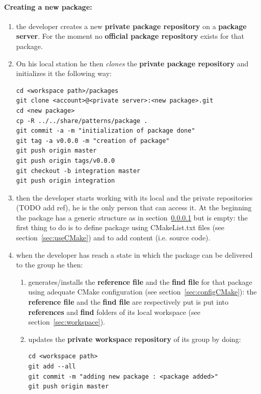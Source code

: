 \documentclass[12pt,a4paper]{article}
\begin{document}
\paragraph{Creating a new package:}
\begin{enumerate}
\item the developer creates a new \textbf{private package repository} on a \textbf{package server}. For the moment no \textbf{official package repository} exists for that package.
\item On his local station he then \textit{clones} the \textbf{private package repository} and initializes it the following way:
\begin{verbatim}
cd <workspace path>/packages
git clone <account>@<private server>:<new package>.git
cd <new package>
cp -R ../../share/patterns/package .
git commit -a -m "initialization of package done"
git tag -a v0.0.0 -m "creation of package"
git push origin master
git push origin tags/v0.0.0
git checkout -b integration master
git push origin integration
\end{verbatim}
\item then the developer starts working with its local and the private repositories (TODO add ref), he is the only person that can access it. At the beginning the package has a generic structure as in section~\ref{} but is empty: the first thing to do is to define package using CMakeList.txt files (see section~\ref{sec:useCMake}) and to add content (i.e. source code).
\item when the developer has reach a state in which the package can be delivered to the group he then:
\begin{enumerate}
\item generates/installs the \textbf{reference file} and the \textbf{find file} for that package using adequate CMake configuration (see section~\ref{sec:configCMake}): the \textbf{reference file} and the \textbf{find file} are respectively put is put into \textbf{references} and \textbf{find} folders of its local workspace (see section~\ref{sec:workspace}).
\item updates the \textbf{private workspace repository} of its group by doing:
\begin{verbatim}
cd <workspace path>
git add --all
git commit -m "adding new package : <package added>"
git push origin master
\end{verbatim}
\end{enumerate}
\end{enumerate}
\end{document}
